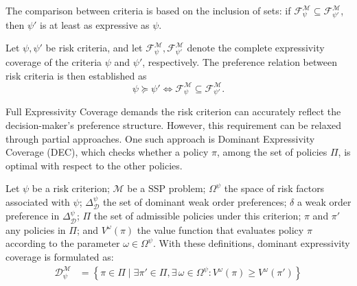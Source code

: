\documentclass[runningheads]{llncs}
\begin{document}
The comparison between criteria is based on the inclusion of sets: if $\mathcal{F}^{\mathcal{M}}_{\psi} \subseteq \mathcal{F}^{\mathcal{M}}_{\psi'}$, then $\psi'$ is at least as expressive as $\psi$.

\begin{definition}
    Let $\psi, \psi'$ be risk criteria, and let $\mathcal{F}^{\mathcal{M}}_{\psi}, \mathcal{F}^{\mathcal{M}}_{\psi'}$ denote the complete expressivity coverage of the criteria $\psi$ and $\psi'$, respectively. The preference relation between risk criteria is then established as
    \begin{equation}
        \psi \succeq \psi' \iff \mathcal{F}^{\mathcal{M}}_{\psi} \subseteq \mathcal{F}^{\mathcal{M}}_{\psi'}.
    \end{equation}
\end{definition}

Full Expressivity Coverage demands the risk criterion can accurately reflect the decision-maker's preference structure. However, this requirement can be relaxed through partial approaches. One such approach is Dominant Expressivity Coverage (DEC), which checks whether a policy $\pi$, among the set of policies $\Pi$, is optimal with respect to the other policies.

\begin{definition}
    Let $\psi$ be a risk criterion; ${\mathcal{M}}$ be a SSP problem; $\Omega^{\psi}$ the space of risk factors associated with $\psi$; $\Delta^{\psi}_{\mathcal{D}}$ the set of dominant weak order preferences; $\delta$ a weak order preference in $\Delta^{\psi}_{\mathcal{D}}$; $\Pi$ the set of admissible policies under this criterion; $\pi$ and $\pi'$ any policies in $\Pi$; and $V^{\omega}(\pi)$ the value function that evaluates policy $\pi$ according to the parameter $\omega \in \Omega^{\psi}$. With these definitions, dominant expressivity coverage is formulated as:
    \begin{equation}
        \begin{aligned}
        \mathcal{D}^{\mathcal{M}}_\psi
        &= \left\{ \pi \in \Pi
             \mid \exists \pi' \in \Pi , \exists\,\omega\in\Omega^\psi : V^{\omega}(\pi) \geq V^{\omega}(\pi')
        \right\}
        \end{aligned}
    \end{equation}
\end{definition}
\end{document}

